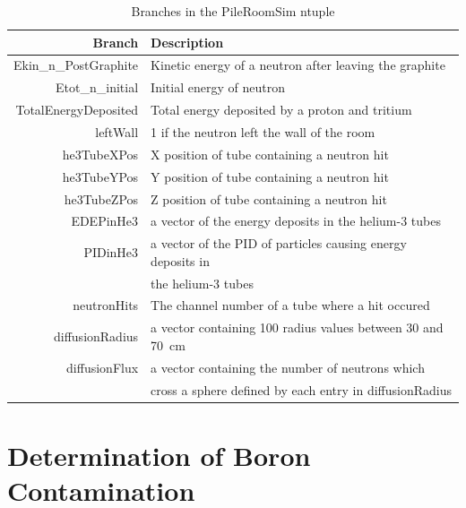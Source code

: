 \documentclass{article}
\begin{document}
	
\begin{table}[ht]
	\centering
	\begin{tabular}{ rl }
		Branch	&	Description	\\	\hline	\hline
Ekin\_n\_PostGraphite	&	Kinetic energy of a neutron after leaving the graphite	\\		
Etot\_n\_initial	&	Initial energy of neutron	\\		
TotalEnergyDeposited	&	Total energy deposited by a proton and tritium	\\		
leftWall	&	1 if the neutron left the wall of the room	\\		
he3TubeXPos	&	X position of tube containing a neutron hit	\\		
he3TubeYPos	&	Y position of tube containing a neutron hit	\\		
he3TubeZPos	&	Z position of tube containing a neutron hit	\\		
EDEPinHe3	&	a vector of the energy deposits in the helium-3 tubes	\\		
PIDinHe3	&	a vector of the PID of particles causing energy deposits in 	\\		
	&	the helium-3 tubes	\\		
neutronHits	&	The channel number of a tube where a hit occured	\\		
diffusionRadius	&	a vector containing 100 radius values between 30 and 70~cm	\\		
diffusionFlux	&	a vector containing the number of neutrons which 	\\		
	&	cross a sphere defined by each entry in diffusionRadius	\\	\hline	

	
	\end{tabular}
	\caption{Branches in the PileRoomSim ntuple}
	\label{tab:branches}
\end{table}	




\section{Determination of Boron Contamination}
\end{document}
